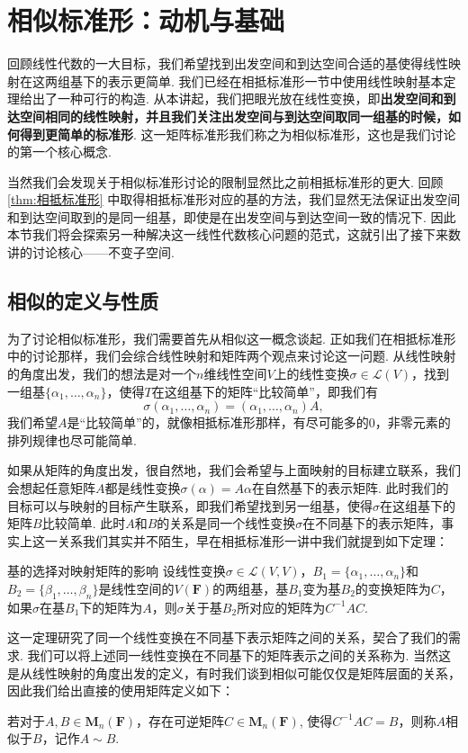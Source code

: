 \chapter{相似标准形：动机与基础}

回顾线性代数的一大目标，我们希望找到出发空间和到达空间合适的基使得线性映射在这两组基下的表示更简单. 我们已经在相抵标准形一节中使用线性映射基本定理给出了一种可行的构造. 从本讲起，我们把眼光放在线性变换，即\textbf{出发空间和到达空间相同的线性映射，并且我们关注出发空间与到达空间取同一组基的时候，如何得到更简单的标准形}. 这一矩阵标准形我们称之为相似标准形，这也是我们讨论的第一个核心概念.

当然我们会发现关于相似标准形讨论的限制显然比之前相抵标准形的更大. 回顾\autoref{thm:相抵标准形} 中取得相抵标准形对应的基的方法，我们显然无法保证出发空间和到达空间取到的是同一组基，即使是在出发空间与到达空间一致的情况下. 因此本节我们将会探索另一种解决这一线性代数核心问题的范式，这就引出了接下来数讲的讨论核心——不变子空间.

\section{相似的定义与性质}

为了讨论相似标准形，我们需要首先从相似这一概念谈起. 正如我们在相抵标准形中的讨论那样，我们会综合线性映射和矩阵两个观点来讨论这一问题. 从线性映射的角度出发，我们的想法是对一个$n$维线性空间$V$上的线性变换$\sigma\in\mathcal{L}(V)$，找到一组基$\{\alpha_1,\ldots,\alpha_n\}$，使得$T$在这组基下的矩阵``比较简单''，即我们有
\[\sigma(\alpha_1,\ldots,\alpha_n)=(\alpha_1,\ldots,\alpha_n)A,\]
我们希望$A$是``比较简单''的，就像相抵标准形那样，有尽可能多的$0$，非零元素的排列规律也尽可能简单.

如果从矩阵的角度出发，很自然地，我们会希望与上面映射的目标建立联系，我们会想起任意矩阵$A$都是线性变换$\sigma(\alpha)=A\alpha$在自然基下的表示矩阵. 此时我们的目标可以与映射的目标产生联系，即我们希望找到另一组基，使得$\sigma$在这组基下的矩阵$B$比较简单. 此时$A$和$B$的关系是同一个线性变换$\sigma$在不同基下的表示矩阵，事实上这一关系我们其实并不陌生，早在相抵标准形一讲中我们就提到如下定理：
\begin{theorem}{基的选择对映射矩阵的影响}{}
    设线性变换$\sigma \in \mathcal{L}(V,V)$，$B_1=\{\alpha_1,\ldots,\alpha_n\}$和$B_2=\{\beta_1,\ldots,\beta_n\}$是线性空间的$V(\mathbf{F})$的两组基，基$B_1$变为基$B_2$的变换矩阵为$C$，如果$\sigma$在基$B_1$下的矩阵为$A$，则$\sigma$关于基$B_2$所对应的矩阵为$C^{-1}AC$.
\end{theorem}
这一定理研究了同一个线性变换在不同基下表示矩阵之间的关系，契合了我们的需求. 我们可以将上述同一线性变换在不同基下的矩阵表示之间的关系称为. 当然这是从线性映射的角度出发的定义，有时我们谈到相似可能仅仅是矩阵层面的关系，因此我们给出直接的使用矩阵定义如下：
\begin{definition}{}{}
    若对于$A,B\in \mathbf{M}_n(\mathbf{F})$，存在可逆矩阵$C\in \mathbf{M}_n(\mathbf{F})$, 使得$C^{-1}AC=B$，则称$A$相似于$B$，记作$A\sim B$.
\end{definition}

